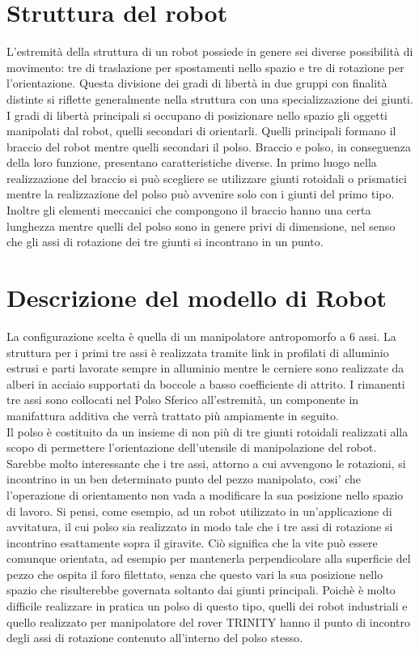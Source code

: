\documentclass[%
corpo=11pt,
twoside,
 stile=classica,
oldstyle,
greek,%
]{toptesi}
\begin{document}
\section{Struttura del robot}
L'estremità della struttura di un robot possiede in genere sei diverse possibilità di movimento: tre di traslazione per spostamenti nello spazio e tre di rotazione per l'orientazione. Questa divisione dei gradi di libertà in due gruppi con finalità distinte si riflette generalmente nella struttura con una specializzazione dei giunti. I gradi di libertà principali si occupano di posizionare nello spazio gli oggetti manipolati dal robot, quelli secondari di orientarli. Quelli principali formano il braccio del robot mentre quelli secondari il polso. Braccio e polso, in conseguenza della loro funzione, presentano caratteristiche diverse. In primo luogo nella realizzazione del braccio si può scegliere se utilizzare giunti rotoidali o prismatici mentre la realizzazione del polso può avvenire solo con i giunti del primo tipo. Inoltre gli elementi meccanici che compongono il braccio hanno una certa lunghezza mentre quelli del polso sono in genere privi di dimensione, nel senso che gli assi di rotazione dei tre giunti si incontrano in un punto. 
\section{Descrizione del modello di Robot}
La configurazione scelta è quella di un manipolatore antropomorfo a 6 assi. La struttura per i primi tre assi è realizzata tramite link in profilati di alluminio estrusi e parti lavorate sempre in alluminio mentre le cerniere sono realizzate da alberi in acciaio supportati da boccole a basso coefficiente di attrito. I rimanenti tre assi sono collocati nel Polso Sferico all'estremità, un componente in manifattura additiva che verrà trattato più ampiamente in seguito. \\
Il polso è costituito da un insieme di non più di tre giunti rotoidali realizzati alla scopo di permettere l'orientazione dell'utensile di manipolazione del robot. 
Sarebbe molto interessante che i tre assi, attorno a cui avvengono le rotazioni, si incontrino in un ben determinato punto del pezzo manipolato, cosi' che l'operazione di orientamento non vada a modificare la sua posizione nello spazio di lavoro. Si pensi, come esempio, ad un robot utilizzato in un'applicazione di avvitatura, il cui polso sia realizzato in modo tale che i tre assi di rotazione si incontrino esattamente sopra il giravite.
 Ciò significa che la vite può essere comunque orientata, ad esempio per mantenerla perpendicolare alla superficie del pezzo che ospita il foro filettato, senza che questo vari la sua posizione nello spazio che risulterebbe governata soltanto dai giunti principali. Poichè è molto difficile realizzare in pratica un polso di questo tipo, quelli dei robot industriali e quello realizzato per manipolatore del rover TRINITY hanno il punto di incontro degli assi di rotazione contenuto all'interno del polso stesso.
\end{document}
